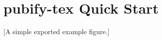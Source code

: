 \documentclass{article}
\begin{document}
\section*{pubify-tex Quick Start}

[A simple exported example figure.]
\end{document}
